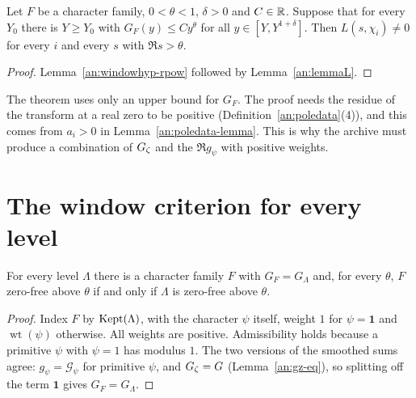 \begin{theorem}\label{an:rpow-window}
Let $F$ be a character family, $0<\theta<1$, $\delta>0$ and $C\in\mathbb{R}$.
Suppose that for every $Y_0$ there is $Y\ge Y_0$ with
$G_F(y)\le Cy^{\theta}$ for all $y\in[Y,Y^{1+\delta}]$. Then
$L(s,\chi_i)\ne0$ for every $i$ and every $s$ with $\Re s>\theta$.
\end{theorem}
\begin{proof}
Lemma~\ref{an:windowhyp-rpow} followed by Lemma~\ref{an:lemmaL}.
\end{proof}

\begin{remark}\label{an:rem-positivity}
The theorem uses only an upper bound for $G_F$. The proof needs the
residue of the transform at a real zero to be positive
(Definition~\ref{an:poledata}(4)), and this comes from $a_i>0$ in
Lemma~\ref{an:poledata-lemma}. This is why the archive must produce a
combination of $G_{\zeta}$ and the $\Re g_{\psi}$ with positive weights.
\end{remark}

\section{The window criterion for every level}

\begin{lemma}\label{an:level-family}
For every level $\Lambda$ there is a character family $F$ with
$G_F=G_{\Lambda}$ and, for every $\theta$, $F$ zero-free above $\theta$ if
and only if $\Lambda$ is zero-free above $\theta$.
\end{lemma}
\begin{proof}
Index $F$ by $\operatorname{Kept}(\Lambda)$, with the character $\psi$ itself, weight
$1$ for $\psi=\mathbf 1$ and $\operatorname{wt}(\psi)$ otherwise. All
weights are positive. Admissibility holds because a primitive $\psi$
with $\psi=1$ has modulus $1$. The two versions of the smoothed sums
agree: $g_{\psi}=\mathcal G_{\psi}$ for primitive $\psi$, and $G_{\zeta}=G$
(Lemma~\ref{an:gz-eq}), so splitting off the term $\mathbf 1$ gives
$G_F=G_{\Lambda}$.
\end{proof}

